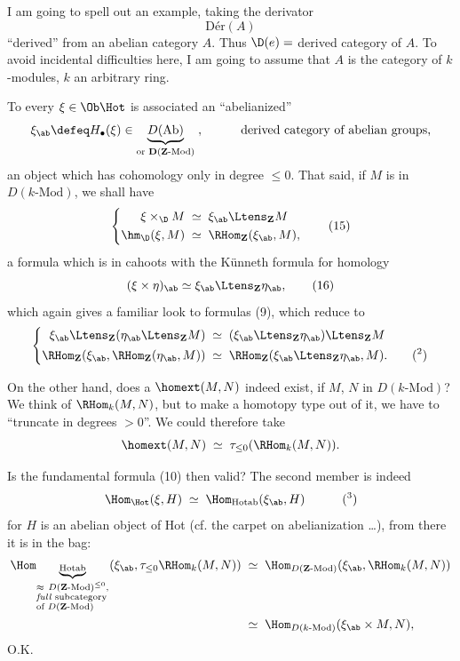 I am going to spell out an example, taking the derivator
\[
\mathrm{Dér}(A)
\]
``derived'' from an abelian category $A$. Thus $\D(e)=$ derived category of $A$. To avoid
incidental difficulties here, I am going to assume that $A$ is the category of $k$-modules, $k$ an arbitrary ring.

To every $\xi\in\Ob\Hot$ is associated an ``abelianized''
\[
\xi_{\ab}\defeq H_{\bullet}(\xi)\in\underbrace{D(\mathrm{Ab})}_{\text{or }\mathbf{D}(\mathbf{Z}\text{-Mod})}\;,\qquad\quad\text{derived category of abelian groups,}
\]
an object which has cohomology only in degree $\le 0$. That said, if $M$ is in $D(k\text{-Mod})$, we shall have
\[
\left\{
\begin{aligned}
\xi\times_{\D}M &\;\simeq\;\xi_{\ab}\Ltens_{\mathbf{Z}}M\\
\hm_{\D}(\xi,M) &\;\simeq\;\RHom_{\mathbf{Z}}(\xi_{\ab},M),
\end{aligned}
\right.
\tag*{(15)}
\]
a formula which is in cahoots with the Künneth formula for homology
\[
(\xi\times\eta)_{\ab}\simeq\xi_{\ab}\Ltens_{\mathbf{Z}}\eta_{\ab},
\tag*{(16)}
\]
which again gives a familiar look to formulas (9), which reduce to
\[
\left\{
\begin{aligned}
\xi_{\ab}\Ltens_{\mathbf{Z}}(\eta_{\ab}\Ltens_{\mathbf{Z}}M) &\;\simeq\;(\xi_{\ab}\Ltens_{\mathbf{Z}}\eta_{\ab})\Ltens_{\mathbf{Z}}M\\
\RHom_{\mathbf{Z}}(\xi_{\ab},\RHom_{\mathbf{Z}}(\eta_{\ab},M)) &\;\simeq\;\RHom_{\mathbf{Z}}(\xi_{\ab}\Ltens_{\mathbf{Z}}\eta_{\ab},M).\qquad\text{(\footnotemark[2])}
\end{aligned}
\right.
\]

On the other hand, does a $\homext(M,N)$ indeed exist, if $M$, $N$ in $D(k\text{-Mod})$? We think of $\RHom_k(M,N)$, but to make a homotopy type out of it, we have to ``truncate in degrees $>0$''. We could therefore take
\[
\homext(M,N)\;\simeq\;\tau_{\le 0}(\RHom_k(M,N)).
\]

Is the fundamental formula (10) then valid? The second member is indeed
\[
\Hom_{\Hot}(\xi,H)\;\simeq\;\Hom_{\mathrm{Hotab}}(\xi_{\ab},H)\qquad\quad\text{(\footnotemark[3])}
\]
for $H$ is an abelian object of Hot (cf. the carpet on abelianization \ldots), from there it is in the bag:
\[
\begin{aligned}
\Hom_{\underbrace{\scriptstyle\mathrm{Hotab}}_{\begin{subarray}{l}\approx\ D(\mathbf{Z}\text{-Mod})^{\le 0},\\ \text{\textit{full} subcategory}\\ \text{of }D(\mathbf{Z}\text{-Mod})\end{subarray}}}(\xi_{\ab},\tau_{\le 0}\RHom_k(M,N)) &\;\simeq\;\Hom_{D(\mathbf{Z}\text{-Mod})}(\xi_{\ab},\RHom_k(M,N))\\
&\;\simeq\;\Hom_{D(k\text{-Mod})}(\xi_{\ab}\times M,N),
\end{aligned}
\]
O.K.

